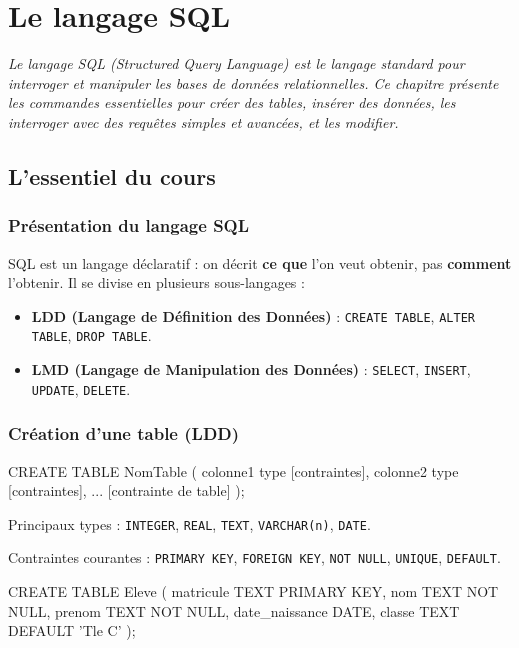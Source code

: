 \chapter{Le langage SQL}

\textit{Le langage SQL (Structured Query Language) est le langage standard pour interroger et manipuler les bases de données relationnelles. Ce chapitre présente les commandes essentielles pour créer des tables, insérer des données, les interroger avec des requêtes simples et avancées, et les modifier.}

\section{L'essentiel du cours}

\subsection{Présentation du langage SQL}
SQL est un langage déclaratif : on décrit \textbf{ce que} l'on veut obtenir, pas \textbf{comment} l'obtenir. Il se divise en plusieurs sous-langages :
\begin{itemize}
    \item \textbf{LDD (Langage de Définition des Données)} : \texttt{CREATE TABLE}, \texttt{ALTER TABLE}, \texttt{DROP TABLE}.
    \item \textbf{LMD (Langage de Manipulation des Données)} : \texttt{SELECT}, \texttt{INSERT}, \texttt{UPDATE}, \texttt{DELETE}.
\end{itemize}

\subsection{Création d'une table (LDD)}
\begin{definition}
\begin{sqlcode}
CREATE TABLE NomTable (
    colonne1 type [contraintes],
    colonne2 type [contraintes],
    ...
    [contrainte de table]
);
\end{sqlcode}
\end{definition}

Principaux types : \texttt{INTEGER}, \texttt{REAL}, \texttt{TEXT}, \texttt{VARCHAR(n)}, \texttt{DATE}.

Contraintes courantes : \texttt{PRIMARY KEY}, \texttt{FOREIGN KEY}, \texttt{NOT NULL}, \texttt{UNIQUE}, \texttt{DEFAULT}.

\begin{exemple}
\begin{sqlcode}
CREATE TABLE Eleve (
    matricule TEXT PRIMARY KEY,
    nom TEXT NOT NULL,
    prenom TEXT NOT NULL,
    date_naissance DATE,
    classe TEXT DEFAULT 'Tle C'
);
\end{sqlcode}
\end{exemple}

